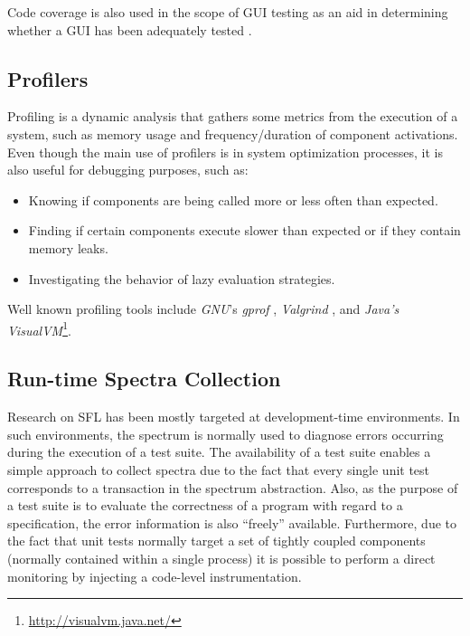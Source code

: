 Code coverage is also used in the scope of \ac{GUI} testing as an aid
in determining whether a \ac{GUI} has been adequately tested
\citep{Memon01}.
%

\subsection*{Profilers}
\label{sec:related-work:profiling}

Profiling is a dynamic analysis that gathers some metrics from the
execution of a system, such as memory usage and frequency/duration of
component activations.
%
Even though the main use of profilers is in system optimization
processes, it is also useful for debugging purposes, such as:

\begin{itemize}[nolistsep]
\item Knowing if components are being called more or less often than
  expected.
\item Finding if certain components execute slower than expected or if
  they contain memory leaks.
\item Investigating the behavior of lazy evaluation strategies.
\end{itemize}

Well known profiling tools include \emph{GNU}'s \emph{gprof}
\citep{Graham82}, \emph{Valgrind} \citep{Nethercote03}, and
\emph{Java's VisualVM}\footnote{\url{http://visualvm.java.net/}}.



\subsection*{Run-time Spectra Collection}
Research on \ac{SFL} has been mostly targeted at development-time
environments.
%
In such environments, the spectrum is normally used to diagnose errors
occurring during the execution of a test suite.
%
The availability of a test suite enables a simple approach to collect
spectra due to the fact that every single unit test corresponds to a
transaction in the spectrum abstraction.
%
Also, as the purpose of a test suite is to evaluate the correctness of
a program with regard to a specification, the error information is
also ``freely'' available.
%
Furthermore, due to the fact that unit tests normally target a set of
tightly coupled components (normally contained within a single
process) it is possible to perform a direct monitoring by injecting a
code-level instrumentation.

